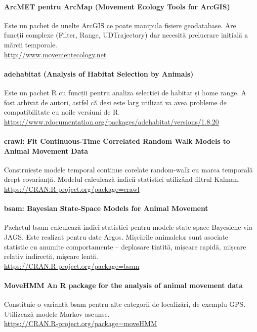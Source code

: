 \documentclass[11pt,onehalfspacing]{elife}
\begin{document}
\paragraph{ArcMET pentru ArcMap (Movement Ecology Tools for ArcGIS)}
Este un pachet de unelte ArcGIS ce poate manipula fișiere geodatabase. Are funcții complexe (Filter, Range, UDTrajectory) dar necesită prelucrare inițială a mărcii temporale.\\
\url{http://www.movementecology.net}

\paragraph{adehabitat (Analysis of Habitat Selection by Animals)}
Este un pachet R cu funcții pentru analiza selecției de habitat și home range. A fost arhivat de autori, astfel că deși este larg utilizat va avea probleme de compatibilitate cu noile versiuni de R.\\
\url{https://www.rdocumentation.org/packages/adehabitat/versions/1.8.20}

\paragraph{crawl: Fit Continuous-Time Correlated Random Walk Models to Animal Movement Data}
Construiește modele temporal continue corelate random-walk cu marca temporală drept covarianță. Modelul calculează indicii statistici utilizând filtrul Kalman.\\
\url{https://CRAN.R-project.org/package=crawl}

\paragraph{bsam: Bayesian State-Space Models for Animal Movement}
Pachetul bsam calculează indici statistici pentru modele state-space Bayesiene via JAGS. Este realizat pentru date Argos. Mișcările animalelor sunt asociate statistic cu anumite  comportamente – deplasare țintită, mișcare rapidă, mișcare relativ indirectă, mișcare lentă.\\
\url{https://CRAN.R-project.org/package=bsam}

\paragraph{MoveHMM An R package for the analysis of animal movement data}
Constituie o variantă bsam pentru alte categorii de localizări, de exemplu GPS. Utilizează modele Markov ascunse.\\
\url{https://CRAN.R-project.org/package=moveHMM}
\end{document}
